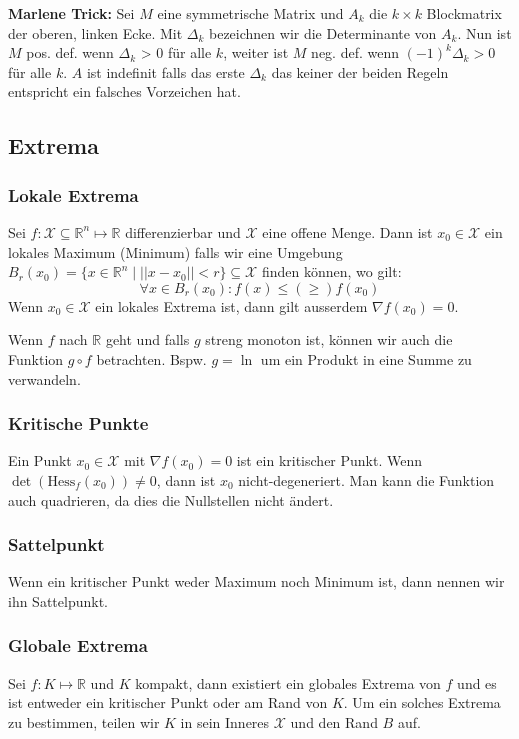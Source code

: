 \documentclass[a4paper,10pt]{article}
\def\R{\mathbb{R}}
\def\X{\mathcal{X}}
\begin{document}
\textbf{Marlene Trick:} Sei $M$ eine symmetrische Matrix und $A_k$ die $k \times k$ Blockmatrix der oberen, linken Ecke. Mit $\Delta_k$ bezeichnen wir die Determinante von $A_k$. Nun ist $M$ pos. def. wenn $\Delta_k$ > 0 für alle $k$, weiter ist $M$ neg. def.
wenn $(-1)^k \Delta_k > 0$ für alle $k$. $A$ ist indefinit falls das erste $\Delta_k$ das keiner der beiden Regeln entspricht ein falsches Vorzeichen hat.

\subsection{Extrema}
\subsubsection*{Lokale Extrema}
Sei \(f: \X \subseteq \R^n \mapsto \R\) differenzierbar und \(\X\) eine offene Menge. Dann ist \(x_0 \in \X\) ein lokales Maximum (Minimum) falls wir eine Umgebung \(B_r(x_0) = \{x\in \R^n \mid ||x-x_0|| < r \} \subseteq \X\) finden können, wo gilt:
\[\forall x \in B_r(x_0): f(x) \le (\ge) f(x_0)\]
Wenn \(x_0 \in \X\) ein lokales Extrema ist, dann gilt ausserdem \(\nabla f(x_0) = 0\).

Wenn $f$ nach $\R$ geht und falls $g$ streng monoton ist, können wir auch die Funktion $g \circ f$ betrachten. Bspw. $g = \ln$ um ein Produkt in eine Summe zu verwandeln.

\subsubsection*{Kritische Punkte}
Ein Punkt \(x_0 \in \X\) mit \(\nabla f(x_0) = 0\) ist ein kritischer Punkt. Wenn \(\det(\text{Hess}_f(x_0)) \ne 0\), dann ist \(x_0\) nicht-degeneriert. Man kann die Funktion auch quadrieren, da dies die Nullstellen nicht ändert.

\subsubsection*{Sattelpunkt}
Wenn ein kritischer Punkt weder Maximum noch Minimum ist, dann nennen wir ihn Sattelpunkt.

\subsubsection*{Globale Extrema}
Sei \(f: K \mapsto \R\) und \(K\) kompakt, dann existiert ein globales Extrema von \(f\) und es ist entweder ein kritischer Punkt oder am Rand von \(K\). Um ein solches Extrema zu bestimmen, teilen wir \(K\) in sein Inneres \(\X\) und den Rand \(B\) auf. 
\end{document}
